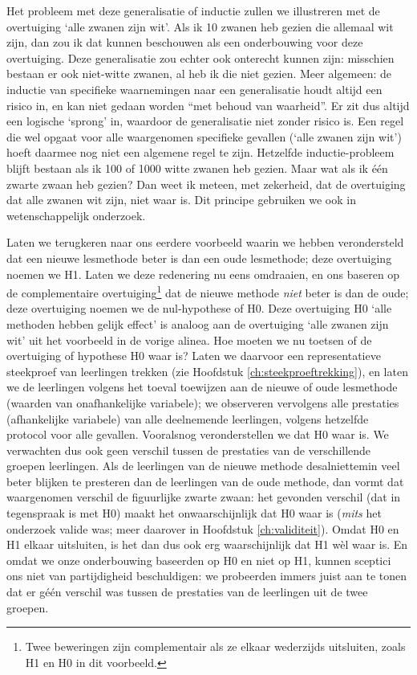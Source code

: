 \documentclass[
]{book}
\begin{document}
Het probleem met deze generalisatie of inductie zullen we illustreren
met de overtuiging `alle zwanen zijn wit'. Als ik 10 zwanen heb gezien
die allemaal wit zijn, dan zou ik dat kunnen beschouwen als een
onderbouwing voor deze overtuiging. Deze generalisatie zou echter ook
onterecht kunnen zijn: misschien bestaan er ook niet-witte zwanen, al
heb ik die niet gezien. Meer algemeen: de inductie van specifieke
waarnemingen naar een generalisatie houdt altijd een risico in, en kan
niet gedaan worden ``met behoud van waarheid''. Er zit dus altijd een
logische `sprong' in, waardoor de generalisatie niet zonder risico is.
Een regel die wel opgaat voor alle waargenomen specifieke gevallen
(`alle zwanen zijn wit') hoeft daarmee nog niet een algemene regel te
zijn. Hetzelfde inductie-probleem blijft bestaan als ik 100 of 1000
witte zwanen heb gezien. Maar wat als ik één zwarte zwaan heb gezien?
Dan weet ik meteen, met zekerheid, dat de overtuiging dat alle zwanen
wit zijn, niet waar is. Dit principe gebruiken we ook in
wetenschappelijk onderzoek.

Laten we terugkeren naar ons eerdere voorbeeld waarin we hebben
verondersteld dat een nieuwe lesmethode beter is dan een oude
lesmethode; deze overtuiging noemen we H1. Laten we deze redenering nu
eens omdraaien, en ons baseren op de complementaire overtuiging\footnote{Twee beweringen zijn complementair als ze elkaar wederzijds uitsluiten, zoals H1 en H0 in dit voorbeeld.} dat
de nieuwe methode \emph{niet} beter is dan de oude; deze overtuiging noemen
we de nul-hypothese of H0. Deze overtuiging H0 `alle methoden hebben
gelijk effect' is analoog aan de overtuiging `alle zwanen zijn wit' uit
het voorbeeld in de vorige alinea. Hoe moeten we nu toetsen of de
overtuiging of hypothese H0 waar is? Laten we daarvoor een
representatieve steekproef van leerlingen trekken (zie
Hoofdstuk \ref{ch:steekproeftrekking}), en laten we de leerlingen volgens
het toeval toewijzen aan de nieuwe of oude lesmethode (waarden van
onafhankelijke variabele); we observeren vervolgens alle prestaties
(afhankelijke variabele) van alle deelnemende leerlingen, volgens
hetzelfde protocol voor alle gevallen. Vooralsnog veronderstellen we dat
H0 waar is. We verwachten dus ook geen verschil tussen de prestaties van
de verschillende groepen leerlingen. Als de leerlingen van de nieuwe
methode desalniettemin veel beter blijken te presteren dan de leerlingen
van de oude methode, dan vormt dat waargenomen verschil de figuurlijke
zwarte zwaan: het gevonden verschil (dat in tegenspraak is met H0) maakt
het onwaarschijnlijk dat H0 waar is (\emph{mits} het onderzoek valide was;
meer daarover in Hoofdstuk \ref{ch:validiteit}). Omdat H0 en H1 elkaar
uitsluiten, is het dan dus ook erg waarschijnlijk dat H1 wèl waar is. En
omdat we onze onderbouwing baseerden op H0 en niet op H1, kunnen
sceptici ons niet van partijdigheid beschuldigen: we probeerden immers
juist aan te tonen dat er géén verschil was tussen de prestaties van de
leerlingen uit de twee groepen.
\end{document}
